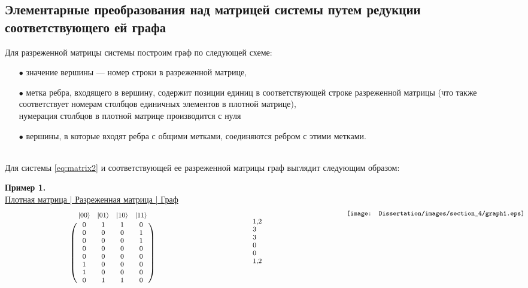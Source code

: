 \subsection{Элементарные преобразования над матрицей системы путем редукции соответствующего ей графа}\label{subsec:ch4/subsect2}

Для разреженной матрицы системы построим граф по следующей схеме:
\begin{itemize}
	\item[$\bullet$]{значение вершины --- номер строки в разреженной матрице,}
	\item[$\bullet$]{метка ребра, входящего в вершину, содержит позиции единиц в соот­ветствующей строке разреженной матрицы (что также соответствует номерам столбцов единичных элементов в плотной матрице),\\[12pt]
	нумерация столбцов в плотной матрице производится с нуля
	}
	\item[$\bullet$]{вершины, в которые входят ребра с общими метками, соединяются реб­ром с этими метками.}
\end{itemize}
\
\\[0pt]
\indent Для системы \eqref{eq:matrix2} и соответствующей ее разреженной матрицы граф выглядит следующим образом:

\clearpage
\noindent\textbf{Пример 1.}
\\[18pt]
\underline{\hspace{1.5em} Плотная матрица \hspace{1.5em} | \hspace{1em} Разреженная матрица \hspace{1em} | \hspace{3em} Граф \hspace{3.5em}}\\

\[
\hspace{1em}{\footnotesize
\parbox[b][5cm][t]{50mm}{
	\bordermatrix{
		& |00\ra & |01\ra & |10\ra & |11\ra \cr
		& 0 & 1 & 1 & 0 \cr
		& 0 & 0 & 0 & 1 \cr
		& 0 & 0 & 0 & 1 \cr
		& 0 & 0 & 0 & 0 \cr
		& 0 & 0 & 0 & 0 \cr
		& 1 & 0 & 0 & 0 \cr
		& 1 & 0 & 0 & 0 \cr
		& 0 & 1 & 1 & 0 \cr
	}
}
\hfill
\hspace{9.5em}\parbox[b][5cm][t]{35mm}{
	\begin{flushleft}
		1,2\\
		3\\
		3\\
		0\\
		0\\
		1,2
	\end{flushleft}
}
\hfill
\hspace{1.5em}\parbox[b][5cm][t]{50mm}{
	\texttt{[image: Dissertation/images/section\_4/graph1.eps]}
}
}\label{eq:graph}
\]

